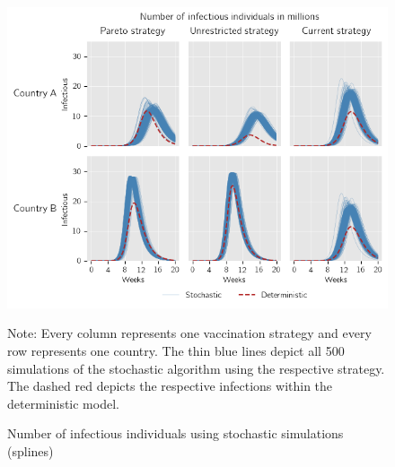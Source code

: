 \begin{figure}[h!]
\centering
\includegraphics[scale=0.85]{images/splines_stochastic_infectious.png}
\begin{flushleft}
\scriptsize{Note:} Every column represents one vaccination strategy and every row represents one country. The thin blue lines depict all 500 simulations of the stochastic algorithm using the respective strategy. The dashed red depicts the respective infections within the deterministic model. 
\end{flushleft}
\caption{Number of infectious individuals using stochastic simulations (splines)}
\label{fig:results_splines_infectious_dead_stochastic}
\end{figure}















